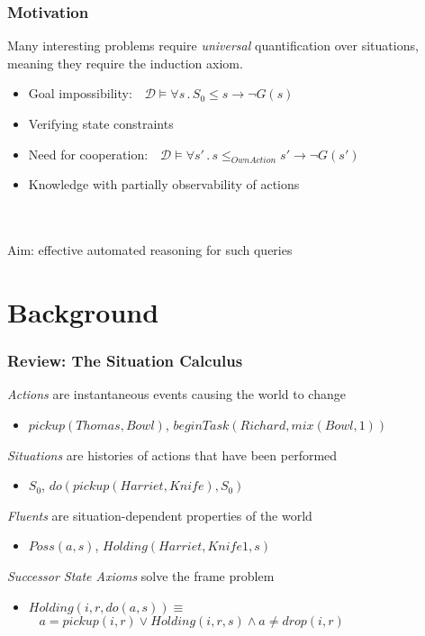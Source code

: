 \documentclass[compress]{beamer}
\begin{document}
\begin{frame}
\frametitle{Motivation}
Many interesting problems require \emph{universal} quantification over
situations, meaning they require the induction axiom.
\begin{itemize}
  \item Goal impossibility: $\,\,\,\,\mathcal{D} \models \forall s\,.\,S_0 \leq s \rightarrow \neg G(s)$
  \item Verifying state constraints
  \item Need for cooperation: $\,\,\,\,\mathcal{D} \models \forall s'\,.\,s \leq_{OwnAction} s' \rightarrow \neg G(s')$
  \item Knowledge with partially observability of actions
\end{itemize}
\ \\
\ \\
Aim: effective automated reasoning for such queries
\end{frame}

\section{Background}

\begin{frame}
\frametitle{Review: The Situation Calculus}
\emph{Actions} are instantaneous events causing the world to change
\begin{itemize}
  \item $pickup(Thomas,Bowl)$, $beginTask(Richard,mix(Bowl,1))$
\end{itemize}
\emph{Situations} are histories of actions that have been performed
\begin{itemize}
  \item $S_0$, $do(pickup(Harriet,Knife),S_0)$
\end{itemize}
\emph{Fluents} are situation-dependent properties of the world
\begin{itemize}
  \item $Poss(a,s)$, $Holding(Harriet,Knife1,s)$
\end{itemize}
\emph{Successor State Axioms} solve the frame problem
\begin{itemize}
  \item $Holding(i,r,do(a,s)) \equiv$ \\ $\,\,\,\,\,a=pickup(i,r) \vee Holding(i,r,s) \wedge a\neq drop(i,r)$
\end{itemize}
\ \\
\end{frame}
\end{document}
